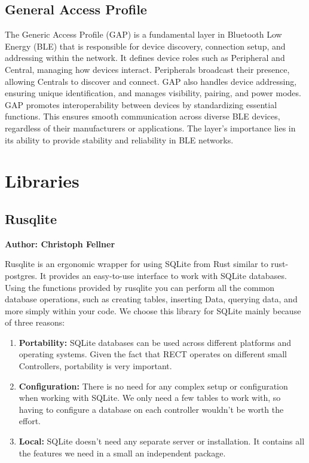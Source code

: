 \subsection{General Access Profile}
The Generic Access Profile (GAP) is a fundamental layer in Bluetooth Low Energy (BLE) that is responsible for device discovery, connection setup, and addressing within the network. It defines device roles such as Peripheral and Central, managing how devices interact. Peripherals broadcast their presence, allowing Centrals to discover and connect. GAP also handles device addressing, ensuring unique identification, and manages visibility, pairing, and power modes. GAP promotes interoperability between devices by standardizing essential functions. This ensures smooth communication across diverse BLE devices, regardless of their manufacturers or applications. The layer's importance lies in its ability to provide stability and reliability in BLE networks.

\section{Libraries}

\subsection{Rusqlite}
\textbf{Author: Christoph Fellner}

Rusqlite is an ergonomic wrapper for using SQLite from Rust similar to rust-postgres. It provides an easy-to-use interface to work with SQLite databases. Using the functions provided by rusqlite you can perform all the common database operations, such as creating tables, inserting Data, querying data, and more simply within your code. 
We choose this library for SQLite mainly because of three reasons:
\begin{enumerate}
    \item \textbf{Portability:} SQLite databases can be used across different platforms and operating systems. Given the fact that RECT operates on different small Controllers, portability is very important.
    \item \textbf{Configuration:} There is no need for any complex setup or configuration when working with SQLite. We only need a few tables to work with, so having to configure a database on each controller wouldn't be worth the effort.
    \item \textbf{Local:} SQLite doesn't need any separate server or installation. It contains all the features we need in a small an independent package.
\end{enumerate}

